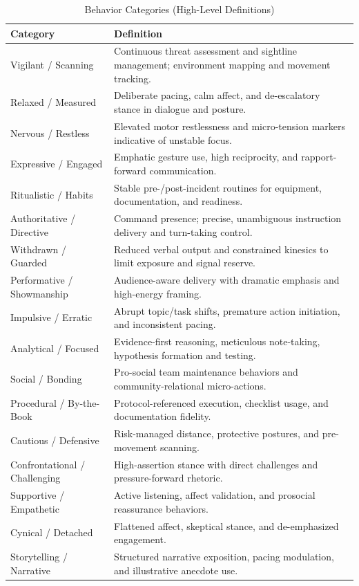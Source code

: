 \documentclass[11pt]{article}
\begin{document}
\begin{table}[H]
\small
\centering
\caption{Behavior Categories (High-Level Definitions)}
\label{tab:behaviors}
\begin{tabularx}{\columnwidth}{|X|X|}
\hline
\textbf{Category} & \textbf{Definition} \\
\hline
Vigilant / Scanning & Continuous threat assessment and sightline management; environment mapping and movement tracking. \\
\hline
Relaxed / Measured & Deliberate pacing, calm affect, and de-escalatory stance in dialogue and posture. \\
\hline
Nervous / Restless & Elevated motor restlessness and micro-tension markers indicative of unstable focus. \\
\hline
Expressive / Engaged & Emphatic gesture use, high reciprocity, and rapport-forward communication. \\
\hline
Ritualistic / Habits & Stable pre-/post-incident routines for equipment, documentation, and readiness. \\
\hline
Authoritative / Directive & Command presence; precise, unambiguous instruction delivery and turn-taking control. \\
\hline
Withdrawn / Guarded & Reduced verbal output and constrained kinesics to limit exposure and signal reserve. \\
\hline
Performative / Showmanship & Audience-aware delivery with dramatic emphasis and high-energy framing. \\
\hline
Impulsive / Erratic & Abrupt topic/task shifts, premature action initiation, and inconsistent pacing. \\
\hline
Analytical / Focused & Evidence-first reasoning, meticulous note-taking, hypothesis formation and testing. \\
\hline
Social / Bonding & Pro-social team maintenance behaviors and community-relational micro-actions. \\
\hline
Procedural / By-the-Book & Protocol-referenced execution, checklist usage, and documentation fidelity. \\
\hline
Cautious / Defensive & Risk-managed distance, protective postures, and pre-movement scanning. \\
\hline
Confrontational / Challenging & High-assertion stance with direct challenges and pressure-forward rhetoric. \\
\hline
Supportive / Empathetic & Active listening, affect validation, and prosocial reassurance behaviors. \\
\hline
Cynical / Detached & Flattened affect, skeptical stance, and de-emphasized engagement. \\
\hline
Storytelling / Narrative & Structured narrative exposition, pacing modulation, and illustrative anecdote use. \\
\hline
\end{tabularx}
\end{table}
\end{document}

